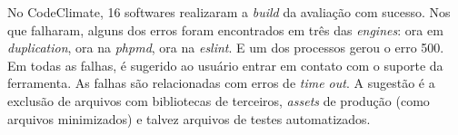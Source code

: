 No CodeClimate, 16 softwares realizaram a \textit{build} da avaliação com
sucesso. Nos que falharam, alguns dos erros foram encontrados em três das
\textit{engines}: ora em \textit{duplication}, ora na \textit{phpmd}, ora na
\textit{eslint}. E um dos processos gerou o erro 500. Em todas as falhas, é
sugerido ao usuário entrar em contato com o suporte da ferramenta. As falhas
são relacionadas com erros de \textit{time out}. A sugestão é a exclusão de
arquivos com bibliotecas de terceiros, \textit{assets} de produção (como
arquivos minimizados) e talvez arquivos de testes automatizados.

